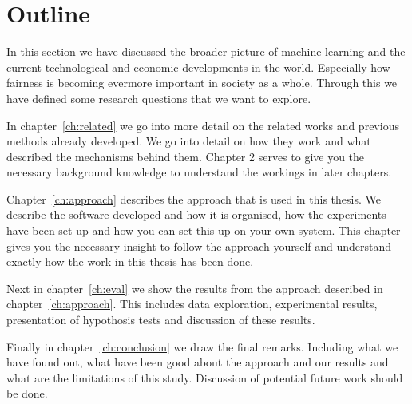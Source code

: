 \section{Outline}
\label{sec:intro:outline}

In this section we have discussed the broader picture of machine learning and the current technological and economic developments in the world. Especially how fairness is becoming evermore important in society as a whole. Through this we have defined some research questions that we want to explore.

In chapter~\ref{ch:related} we go into more detail on the related works and previous methods already developed. We go into detail on how they work and what described the mechanisms behind them. Chapter 2 serves to give you the necessary background knowledge to understand the workings in later chapters.

Chapter~\ref{ch:approach} describes the approach that is used in this thesis. We describe the software developed and how it is organised, how the experiments have been set up and how you can set this up on your own system. This chapter gives you the necessary insight to follow the approach yourself and understand exactly how the work in this thesis has been done.

Next in chapter~\ref{ch:eval} we show the results from the approach described in chapter~\ref{ch:approach}. This includes data exploration, experimental results, presentation of hypothosis tests and discussion of these results. 

Finally in chapter~\ref{ch:conclusion} we draw the final remarks. Including what we have found out, what have been good about the approach and our results and what are the limitations of this study. Discussion of potential future work should be done.